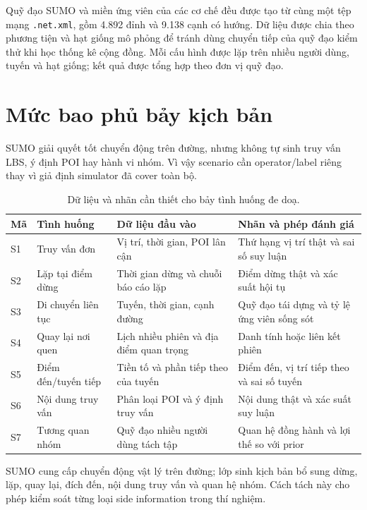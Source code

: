 \documentclass[12pt,a4paper,oneside]{report}
\begin{document}
Quỹ đạo SUMO và miền ứng viên của các cơ chế đều được tạo từ cùng một tệp mạng \texttt{.net.xml}, gồm 4.892 đỉnh và 9.138 cạnh có hướng. Dữ liệu được chia theo phương tiện và hạt giống mô phỏng để tránh dùng chuyển tiếp của quỹ đạo kiểm thử khi học thống kê cộng đồng. Mỗi cấu hình được lặp trên nhiều người dùng, tuyến và hạt giống; kết quả được tổng hợp theo đơn vị quỹ đạo.

\section{Mức bao phủ bảy kịch bản}

SUMO giải quyết tốt chuyển động trên đường, nhưng không tự sinh truy vấn LBS, ý định POI hay hành vi nhóm. Vì vậy scenario cần operator/label riêng thay vì giả định simulator đã cover toàn bộ.

\begin{table}[htbp]
\centering
\footnotesize
\caption{Dữ liệu và nhãn cần thiết cho bảy tình huống đe doạ.}
\label{tab:scenario-coverage}
\begin{tabularx}{\textwidth}{P{1.0cm}P{3.4cm}P{3.2cm}Y}
\toprule
\textbf{Mã} & \textbf{Tình huống} & \textbf{Dữ liệu đầu vào} & \textbf{Nhãn và phép đánh giá} \\
\midrule
S1 & Truy vấn đơn & Vị trí, thời gian, POI lân cận & Thứ hạng vị trí thật và sai số suy luận \\
S2 & Lặp tại điểm dừng & Thời gian dừng và chuỗi báo cáo lặp & Điểm dừng thật và xác suất hội tụ \\
S3 & Di chuyển liên tục & Tuyến, thời gian, cạnh đường & Quỹ đạo tái dựng và tỷ lệ ứng viên sống sót \\
S4 & Quay lại nơi quen & Lịch nhiều phiên và địa điểm quan trọng & Danh tính hoặc liên kết phiên \\
S5 & Điểm đến/tuyến tiếp & Tiền tố và phần tiếp theo của tuyến & Điểm đến, vị trí tiếp theo và sai số tuyến \\
S6 & Nội dung truy vấn & Phân loại POI và ý định truy vấn & Nội dung thật và xác suất suy luận \\
S7 & Tương quan nhóm & Quỹ đạo nhiều người dùng tách tập & Quan hệ đồng hành và lợi thế so với prior \\
\bottomrule
\end{tabularx}
\end{table}

SUMO cung cấp chuyển động vật lý trên đường; lớp sinh kịch bản bổ sung dừng, lặp, quay lại, đích đến, nội dung truy vấn và quan hệ nhóm. Cách tách này cho phép kiểm soát từng loại side information trong thí nghiệm.
\end{document}
